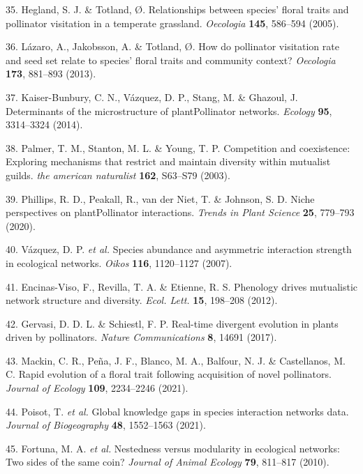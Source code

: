 \documentclass[12pt,a4paper,]{article}
\begin{document}
\hypertarget{ref-hegland2005}{}
35. Hegland, S. J. \& Totland, Ø. Relationships between species' floral
traits and pollinator visitation in a temperate grassland.
\emph{Oecologia} \textbf{145}, 586--594 (2005).

\hypertarget{ref-lazaro2013}{}
36. Lázaro, A., Jakobsson, A. \& Totland, Ø. How do pollinator
visitation rate and seed set relate to species' floral traits and
community context? \emph{Oecologia} \textbf{173}, 881--893 (2013).

\hypertarget{ref-kaiser2014}{}
37. Kaiser-Bunbury, C. N., Vázquez, D. P., Stang, M. \& Ghazoul, J.
Determinants of the microstructure of plantPollinator networks.
\emph{Ecology} \textbf{95}, 3314--3324 (2014).

\hypertarget{ref-palmer2003}{}
38. Palmer, T. M., Stanton, M. L. \& Young, T. P. Competition and
coexistence: Exploring mechanisms that restrict and maintain diversity
within mutualist guilds. \emph{the american naturalist} \textbf{162},
S63--S79 (2003).

\hypertarget{ref-phillips2020}{}
39. Phillips, R. D., Peakall, R., van der Niet, T. \& Johnson, S. D.
Niche perspectives on plantPollinator interactions. \emph{Trends in
Plant Science} \textbf{25}, 779--793 (2020).

\hypertarget{ref-vazquez2007}{}
40. Vázquez, D. P. \emph{et al.} Species abundance and asymmetric
interaction strength in ecological networks. \emph{Oikos} \textbf{116},
1120--1127 (2007).

\hypertarget{ref-encinas2012}{}
41. Encinas-Viso, F., Revilla, T. A. \& Etienne, R. S. Phenology drives
mutualistic network structure and diversity. \emph{Ecol. Lett.}
\textbf{15}, 198--208 (2012).

\hypertarget{ref-gervasi2017}{}
42. Gervasi, D. D. L. \& Schiestl, F. P. Real-time divergent evolution
in plants driven by pollinators. \emph{Nature Communications}
\textbf{8}, 14691 (2017).

\hypertarget{ref-mackin2021}{}
43. Mackin, C. R., Peña, J. F., Blanco, M. A., Balfour, N. J. \&
Castellanos, M. C. Rapid evolution of a floral trait following
acquisition of novel pollinators. \emph{Journal of Ecology}
\textbf{109}, 2234--2246 (2021).

\hypertarget{ref-poisot2021}{}
44. Poisot, T. \emph{et al.} Global knowledge gaps in species
interaction networks data. \emph{Journal of Biogeography} \textbf{48},
1552--1563 (2021).

\hypertarget{ref-fortuna2010}{}
45. Fortuna, M. A. \emph{et al.} Nestedness versus modularity in
ecological networks: Two sides of the same coin? \emph{Journal of Animal
Ecology} \textbf{79}, 811--817 (2010).
\end{document}
